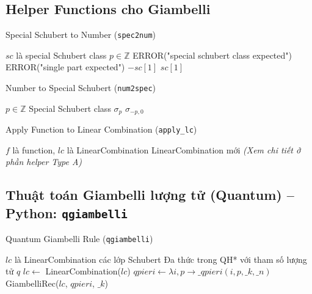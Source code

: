 \subsection*{Helper Functions cho Giambelli}

\begin{algorithm}[H]
\caption{Special Schubert to Number (\texttt{spec2num})}
\begin{algorithmic}[1]
\REQUIRE $sc$ là special Schubert class
\ENSURE $p \in \mathbb{Z}$
    \STATE ERROR("special schubert class expected")
\ENDIF
{}
    \STATE ERROR("single part expected")
\ENDIF
{}
    \RETURN $-sc[1]$
\ELSE
    \RETURN $sc[1]$
\ENDIF
\end{algorithmic}
\end{algorithm}

\begin{algorithm}[H]
\caption{Number to Special Schubert (\texttt{num2spec})}
\begin{algorithmic}[1]
\REQUIRE $p \in \mathbb{Z}$
\ENSURE Special Schubert class
    \RETURN $\sigma_p$
\ELSE
    \RETURN $\sigma_{-p,0}$
\ENDIF
\end{algorithmic}
\end{algorithm}

\begin{algorithm}[H]
\caption{Apply Function to Linear Combination (\texttt{apply\_lc})}
\begin{algorithmic}[1]
\REQUIRE $f$ là function, $lc$ là LinearCombination
\ENSURE LinearCombination mới
\STATE \textit{(Xem chi tiết ở phần helper Type A)}
\end{algorithmic}
\end{algorithm}

\subsection*{Thuật toán Giambelli lượng tử (Quantum) -- Python: \texttt{qgiambelli}}

\begin{algorithm}[H]
\caption{Quantum Giambelli Rule (\texttt{qgiambelli})}
\begin{algorithmic}[1]
\REQUIRE $lc$ là LinearCombination các lớp Schubert
\ENSURE Đa thức trong QH* với tham số lượng tử $q$
\STATE $lc \gets$ LinearCombination($lc$)
\STATE $qpieri \gets \lambda i, p \to \_qpieri(i, p, \_k, \_n)$
\RETURN GiambelliRec($lc$, $qpieri$, $\_k$)
\end{algorithmic}
\end{algorithm}

